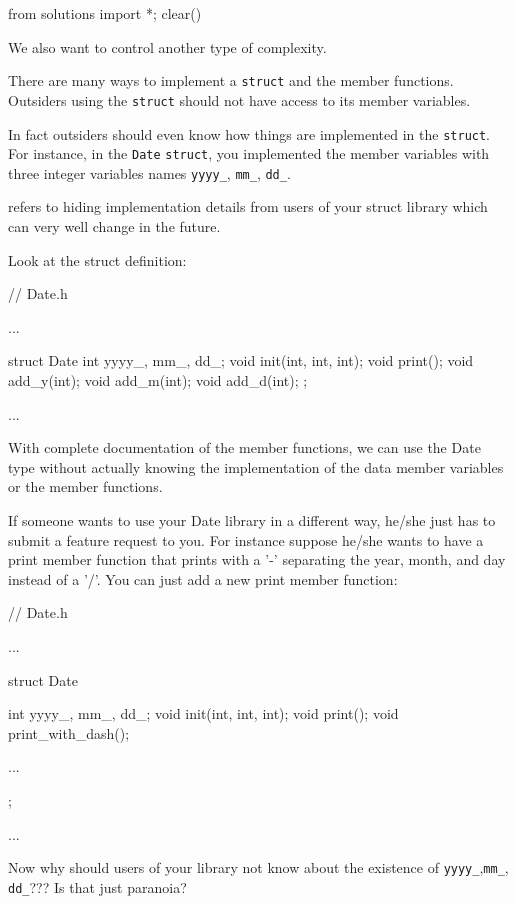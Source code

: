 \begin{python0}
from solutions import *; clear()
\end{python0}

We also want to control another type of complexity.

There are many ways to implement a \texttt{struct} and the member functions. Outsiders using the \texttt{struct} should not have access to its member variables.

In fact outsiders should  even know how things are implemented in the \texttt{struct}. For instance, in the \texttt{Date} \texttt{struct}, you implemented the member variables with three integer variables names \texttt{yyyy\_}, \texttt{mm\_}, \texttt{dd\_}.

 refers to hiding implementation details from users of your struct library which can very well change in the future.

Look at the struct definition:

\begin{consolethree}
// Date.h

...

struct Date
{
    int yyyy_, mm_, dd_;
    void init(int, int, int);
    void print();
    void add_y(int);
    void add_m(int);
    void add_d(int);
};

...
\end{consolethree}
With complete documentation of the member functions, we can use the Date type without actually knowing the implementation of the data member variables or the member functions.

If someone wants to use your Date library in a different way, he/she just
has to submit a feature request to you. For instance suppose he/she
wants to have a print member function that prints with a '-' separating the
year, month, and day instead of a '/'. You can just add a new print
member function:
\begin{consolethree}
// Date.h

...

struct Date
{
    int yyyy_, mm_, dd_;
    void init(int, int, int);
    void print();
    void print_with_dash();

    ...
};

...
\end{consolethree}
Now why should users of your library not know about the existence of \texttt{yyyy\_},\texttt{mm\_}, \texttt{dd\_}??? Is that just paranoia?

